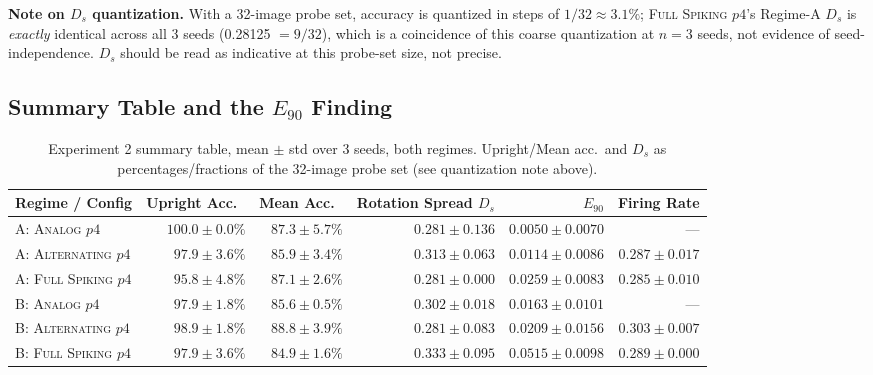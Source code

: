 \documentclass[11pt]{article}
\newcommand{\None}{\textsc{Analog $p4$}}
\newcommand{\Alternating}{\textsc{Alternating $p4$}}
\newcommand{\FullSpiking}{\textsc{Full Spiking $p4$}}
\begin{document}
\FloatBarrier
\textbf{Note on $D_s$ quantization.} With a 32-image probe set, accuracy is quantized in steps of
$1/32 \approx 3.1\%$; \FullSpiking's Regime-A $D_s$ is \emph{exactly} identical across all 3 seeds
(0.28125 $= 9/32$), which is a coincidence of this coarse quantization at $n=3$ seeds, not evidence of
seed-independence. $D_s$ should be read as indicative at this probe-set size, not precise.

\subsection{Summary Table and the $E_{90}$ Finding}

\begin{table}[H]
\centering
\small
\begin{tabular}{@{}lrrrrr@{}}
\toprule
\textbf{Regime / Config} & Upright Acc.\ & Mean Acc.\ & Rotation Spread $D_s$ & $E_{90}$ & Firing Rate \\
\midrule
A: \None         & $100.0 \pm 0.0\%$ & $87.3 \pm 5.7\%$ & $0.281 \pm 0.136$ & $0.0050 \pm 0.0070$ & --- \\
A: \Alternating  & $97.9 \pm 3.6\%$  & $85.9 \pm 3.4\%$ & $0.313 \pm 0.063$ & $0.0114 \pm 0.0086$ & $0.287 \pm 0.017$ \\
A: \FullSpiking  & $95.8 \pm 4.8\%$  & $87.1 \pm 2.6\%$ & $0.281 \pm 0.000$ & $0.0259 \pm 0.0083$ & $0.285 \pm 0.010$ \\
\midrule
B: \None         & $97.9 \pm 1.8\%$  & $85.6 \pm 0.5\%$ & $0.302 \pm 0.018$ & $0.0163 \pm 0.0101$ & --- \\
B: \Alternating  & $98.9 \pm 1.8\%$  & $88.8 \pm 3.9\%$ & $0.281 \pm 0.083$ & $0.0209 \pm 0.0156$ & $0.303 \pm 0.007$ \\
B: \FullSpiking  & $97.9 \pm 3.6\%$  & $84.9 \pm 1.6\%$ & $0.333 \pm 0.095$ & $0.0515 \pm 0.0098$ & $0.289 \pm 0.000$ \\
\bottomrule
\end{tabular}
\caption{Experiment 2 summary table, mean $\pm$ std over 3 seeds, both regimes. Upright/Mean acc.\ and
$D_s$ as percentages/fractions of the 32-image probe set (see quantization note above).}
\label{tab:exp2}
\end{table}
\end{document}
